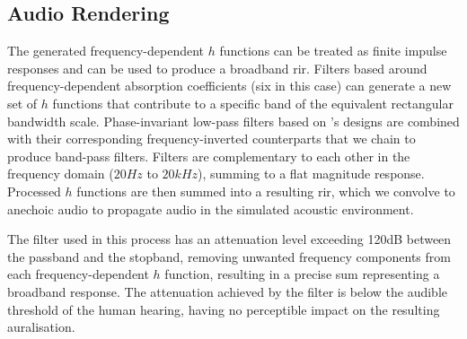 \subsection{Audio Rendering}
The generated frequency-dependent $h$ functions can be treated as finite impulse responses and can be used to produce a broadband \acrshort{rir}. Filters based around frequency-dependent absorption coefficients (six in this case) can generate a new set of $h$ functions that contribute to a specific band of the equivalent rectangular bandwidth scale. Phase-invariant low-pass filters based on \citep{smith1997scientist}'s designs are combined with their corresponding frequency-inverted counterparts that we chain to produce band-pass filters. Filters are complementary to each other in the frequency domain ($20Hz$ to $20kHz$), summing to a flat magnitude response. Processed $h$ functions are then summed into a resulting \acrshort{rir}, which we convolve to anechoic audio to propagate audio in the simulated acoustic environment. \par
The filter used in this process has an attenuation level exceeding 120dB between the passband and the stopband, removing unwanted frequency components from each frequency-dependent $h$ function, resulting in a precise sum representing a broadband response. The attenuation achieved by the filter is below the audible threshold of the human hearing, having no perceptible impact on the resulting auralisation.

